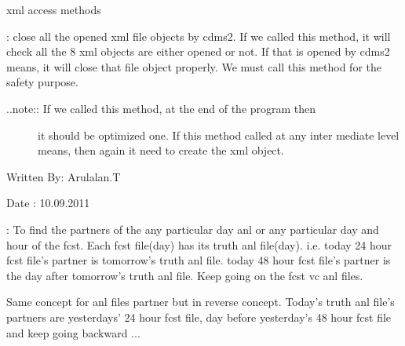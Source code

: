 \documentclass[letterpaper,10pt,english]{sphinxmanual}
\begin{document}
\begin{fulllineitems}
\label{diagnosisutils:xml_data_access.GribXmlAccess}
xml access methods

\begin{fulllineitems}
\label{diagnosisutils:xml_data_access.GribXmlAccess.closeXmlObjs}
{\hyperref[diagnosisutils:xml_data_access.GribXmlAccess.closeXmlObjs]{}}: close all the opened xml file objects by
cdms2. If we called this method, it will check all the 8 xml objects
are either opened or not. If that is opened by cdms2 means, it will
close that file object properly. We must call this method for the
safety purpose.
\begin{description}
\item[{..note:: If we called this method, at the end of the program then}] \leavevmode
it should be optimized one. If this method called at any inter
mediate level means, then again it need to create the xml object.

\end{description}

Written By: Arulalan.T

Date : 10.09.2011

\end{fulllineitems}


\begin{fulllineitems}
\label{diagnosisutils:xml_data_access.GribXmlAccess.findPartners}
{\hyperref[diagnosisutils:xml_data_access.GribXmlAccess.findPartners]{}}: To find the partners of the any particular
day anl or any particular day and hour of the fcst.
Each fcst file(day) has its truth anl file(day).
i.e. today 24 hour fcst file's partner is tomorrow's truth anl file.
today 48 hour fcst file's partner is the day after tomorrow's
truth anl file. Keep going on the fcst vc anl files.

Same concept for anl files partner but in reverse concept.
Today's truth anl file's partners are yesterdays' 24 hour fcst file,
day before yesterday's 48 hour fcst file and keep going backward ...


\end{fulllineitems}
\end{fulllineitems}
\end{document}
